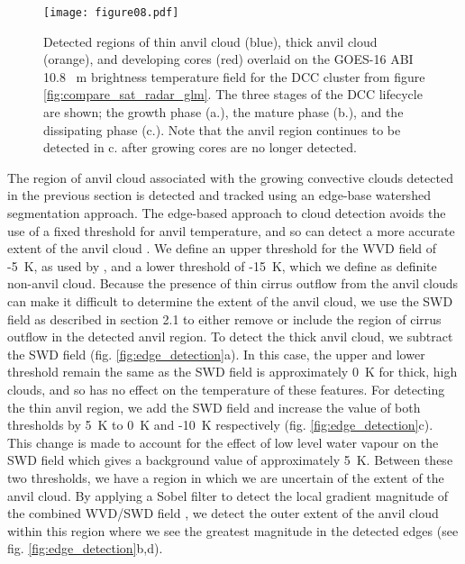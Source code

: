 \begin{figure}[t]
    \texttt{[image: figure08.pdf]}
    \caption{Detected regions of thin anvil cloud (blue), thick anvil cloud (orange), and developing cores (red) overlaid on the GOES-16 ABI 10.8 \unit{\mu m} brightness temperature field for the DCC cluster from figure \ref{fig:compare_sat_radar_glm}. The three stages of the DCC lifecycle are shown; the growth phase (a.), the mature phase (b.), and the dissipating phase (c.). Note that the anvil region continues to be detected in c. after growing cores are no longer detected.}
    \label{fig:detected_anvils}
\end{figure}

The region of anvil cloud associated with the growing convective clouds detected in the previous section is detected and tracked using an edge-base watershed segmentation approach.
The edge-based approach to cloud detection avoids the use of a fixed threshold for anvil temperature, and so can detect a more accurate extent of the anvil cloud \citep{dim_alternative_2013}.
We define an upper threshold for the WVD field of -5~\unit{K}, as used by \citet{muller_role_2018}, and a lower threshold of -15~\unit{K}, which we define as definite non-anvil cloud.
Because the presence of thin cirrus outflow from the anvil clouds can make it difficult to determine the extent of the anvil cloud, we use the SWD field as described in section 2.1 to either remove or include the region of cirrus outflow in the detected anvil region.
To detect the thick anvil cloud, we subtract the SWD field (fig. \ref{fig:edge_detection}a).
In this case, the upper and lower threshold remain the same as the SWD field is approximately 0~K for thick, high clouds, and so has no effect on the temperature of these features.
For detecting the thin anvil region, we add the SWD field and increase the value of both thresholds by 5~K to 0~K and -10~K respectively (fig. \ref{fig:edge_detection}c).
This change is made to account for the effect of low level water vapour on the SWD field which gives a background value of approximately 5~K.
Between these two thresholds, we have a region in which we are uncertain of the extent of the anvil cloud.
By applying a Sobel filter to detect the local gradient magnitude of the combined WVD/SWD field \citep{sobel_isotropic_2014}, we detect the outer extent of the anvil cloud within this region where we see the greatest magnitude in the detected edges (see fig. \ref{fig:edge_detection}b,d).


